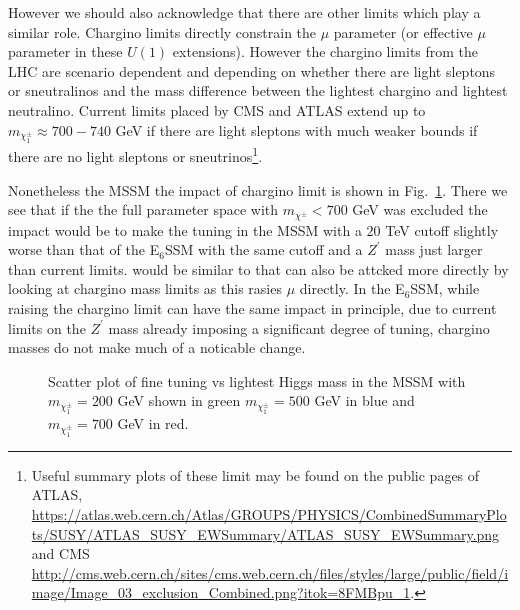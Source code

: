 \documentclass[preprint,amsmath,amssymb,aps,superscriptaddress,prd,showpacs,floatfix,nofootinbib]{revtex4-1}
\begin{document}
However we should also acknowledge that there are other limits which
play a similar role.  Chargino limits directly constrain the $\mu$
parameter (or effective $\mu$ parameter in these $U(1)$ extensions).
However the chargino limits from the LHC are scenario dependent and
depending on whether there are light sleptons or sneutralinos and the mass
difference between the lightest chargino and lightest neutralino.
Current limits placed by CMS and ATLAS extend up to $m_{\chi^\pm_1}
\approx 700-740$ GeV if there are light
sleptons\cite{Khachatryan:2014qwa,Aad:2014nua} with much weaker bounds
if there are no light sleptons or sneutrinos\footnote{Useful summary
  plots of these limit may be found on the public pages of ATLAS,
  \url{https://atlas.web.cern.ch/Atlas/GROUPS/PHYSICS/CombinedSummaryPlots/SUSY/ATLAS_SUSY_EWSummary/ATLAS_SUSY_EWSummary.png}
  and CMS
  \url{http://cms.web.cern.ch/sites/cms.web.cern.ch/files/styles/large/public/field/image/Image_03_exclusion_Combined.png?itok=8FMBpu_1}.}.




Nonetheless the MSSM the impact of chargino limit is shown in
Fig.~\ref{Fig:chargino-plot}.  There we see that if the the full
  parameter space with $m_{\chi^\pm} < 700$ GeV was excluded the
  impact would be to make the tuning in the MSSM with a $20$ TeV
  cutoff slightly worse than that of the E$_6$SSM with the same cutoff
  and a $Z^\prime$ mass just larger than current limits.  would be
  similar to that can also be attcked more directly by looking at
  chargino mass limits as this rasies $\mu$ directly.  In the
  E$_6$SSM, while raising the chargino limit can have the same impact
  in principle, due to current limits on the $Z^\prime$ mass already
  imposing a significant degree of tuning, chargino masses do not make
  much of a noticable change.

\begin{figure}[h]
\begin{center}
\caption{Scatter plot of fine tuning vs lightest Higgs mass in the MSSM with $m_{\chi^\pm_1} = 200$ GeV shown in green $m_{\chi^\pm_1} = 500$ GeV in blue and $m_{\chi^\pm_1} = 700$ GeV in red.}
\label{Fig:chargino-plot}
\end{center}
\end{figure}
\end{document}
